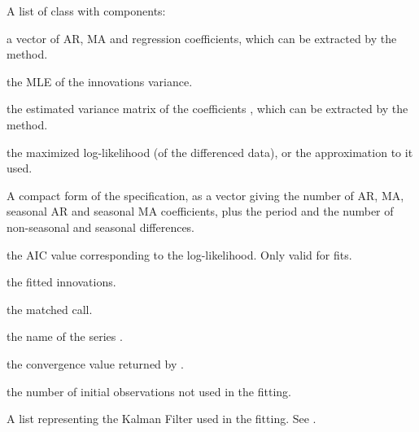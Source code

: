 \begin{Value}
A list of class  with components:

\begin{ldescription}
\item[\code{coef}] a vector of AR, MA and regression coefficients, which can
be extracted by the  method.
\item[\code{sigma2}] the MLE of the innovations variance.
\item[\code{var.coef}] the estimated variance matrix of the coefficients
, which can be extracted by the  method.
\item[\code{loglik}] the maximized log-likelihood (of the differenced data),
or the approximation to it used.
\item[\code{arma}] A compact form of the specification, as a vector giving
the number of AR, MA, seasonal AR and seasonal MA coefficients,
plus the period and the number of non-seasonal and seasonal
differences.
\item[\code{aic}] the AIC value corresponding to the log-likelihood. Only
valid for  fits.
\item[\code{residuals}] the fitted innovations.
\item[\code{call}] the matched call.
\item[\code{series}] the name of the series .
\item[\code{code}] the convergence value returned by .
\item[\code{n.cond}] the number of initial observations not used in the fitting.
\item[\code{model}] A list representing the Kalman Filter used in the
fitting.  See .
\end{ldescription}
\end{Value}
